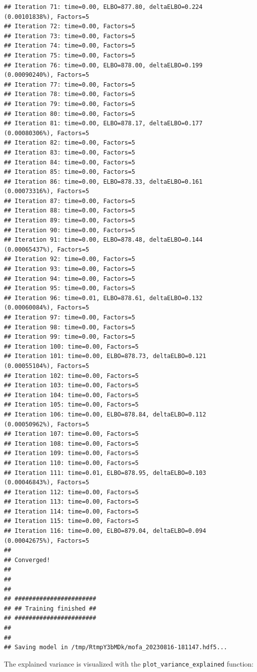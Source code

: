 \documentclass[
]{book}
\begin{document}
\begin{verbatim}
## Iteration 71: time=0.00, ELBO=877.80, deltaELBO=0.224 (0.00101838%), Factors=5
## Iteration 72: time=0.00, Factors=5
## Iteration 73: time=0.00, Factors=5
## Iteration 74: time=0.00, Factors=5
## Iteration 75: time=0.00, Factors=5
## Iteration 76: time=0.00, ELBO=878.00, deltaELBO=0.199 (0.00090240%), Factors=5
## Iteration 77: time=0.00, Factors=5
## Iteration 78: time=0.00, Factors=5
## Iteration 79: time=0.00, Factors=5
## Iteration 80: time=0.00, Factors=5
## Iteration 81: time=0.00, ELBO=878.17, deltaELBO=0.177 (0.00080306%), Factors=5
## Iteration 82: time=0.00, Factors=5
## Iteration 83: time=0.00, Factors=5
## Iteration 84: time=0.00, Factors=5
## Iteration 85: time=0.00, Factors=5
## Iteration 86: time=0.00, ELBO=878.33, deltaELBO=0.161 (0.00073316%), Factors=5
## Iteration 87: time=0.00, Factors=5
## Iteration 88: time=0.00, Factors=5
## Iteration 89: time=0.00, Factors=5
## Iteration 90: time=0.00, Factors=5
## Iteration 91: time=0.00, ELBO=878.48, deltaELBO=0.144 (0.00065437%), Factors=5
## Iteration 92: time=0.00, Factors=5
## Iteration 93: time=0.00, Factors=5
## Iteration 94: time=0.00, Factors=5
## Iteration 95: time=0.00, Factors=5
## Iteration 96: time=0.01, ELBO=878.61, deltaELBO=0.132 (0.00060084%), Factors=5
## Iteration 97: time=0.00, Factors=5
## Iteration 98: time=0.00, Factors=5
## Iteration 99: time=0.00, Factors=5
## Iteration 100: time=0.00, Factors=5
## Iteration 101: time=0.00, ELBO=878.73, deltaELBO=0.121 (0.00055104%), Factors=5
## Iteration 102: time=0.00, Factors=5
## Iteration 103: time=0.00, Factors=5
## Iteration 104: time=0.00, Factors=5
## Iteration 105: time=0.00, Factors=5
## Iteration 106: time=0.00, ELBO=878.84, deltaELBO=0.112 (0.00050962%), Factors=5
## Iteration 107: time=0.00, Factors=5
## Iteration 108: time=0.00, Factors=5
## Iteration 109: time=0.00, Factors=5
## Iteration 110: time=0.00, Factors=5
## Iteration 111: time=0.01, ELBO=878.95, deltaELBO=0.103 (0.00046843%), Factors=5
## Iteration 112: time=0.00, Factors=5
## Iteration 113: time=0.00, Factors=5
## Iteration 114: time=0.00, Factors=5
## Iteration 115: time=0.00, Factors=5
## Iteration 116: time=0.00, ELBO=879.04, deltaELBO=0.094 (0.00042675%), Factors=5
## 
## Converged!
## 
## 
## 
## #######################
## ## Training finished ##
## #######################
## 
## 
## Saving model in /tmp/RtmpY3bMDk/mofa_20230816-181147.hdf5...
\end{verbatim}

The explained variance is visualized with the \texttt{plot\_variance\_explained} function:
\end{document}
